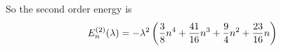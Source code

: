 \documentclass[a4paper,german,12pt,smallheadings]{scrartcl}
\begin{document}
\begin{enumerate}[a)]
    So the second order energy is
    \begin{equation*}
      E_n^{(2)}(\lambda)  = -\lambda^2 \del{\frac{3}{8}n^4 + \frac{41}{16}n^3 + \frac{9}{4}n^2 + \frac{23}{16}n}
    \end{equation*}


\end{enumerate}
\end{document}
